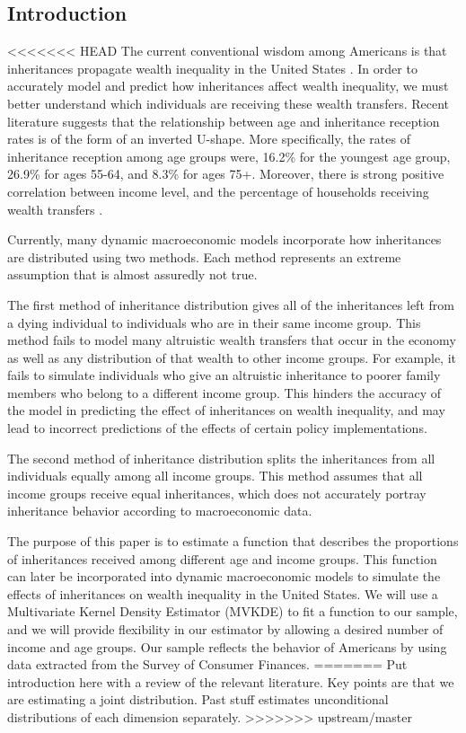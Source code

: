 \documentclass[letterpaper,12pt]{article}
\theoremstyle{definition}
\begin{document}
\begin{spacing}{1.5}

\section{Introduction}\label{SecIntro}

<<<<<<< HEAD
The current conventional wisdom among Americans is that inheritances propagate wealth inequality in the United States \citet{Wolff:2015}. In order to accurately model and predict how inheritances affect wealth inequality, we must better understand which individuals are receiving these wealth transfers. Recent literature suggests that the relationship between age and inheritance reception rates is of the form of an inverted U-shape. More specifically, the rates of inheritance reception among age groups were, 16.2\% for the youngest age group, 26.9\% for ages 55-64, and 8.3\% for ages 75+. Moreover, there is strong positive correlation between income level, and the percentage of households receiving wealth transfers \citet{Wolff:2015}.

Currently, many dynamic macroeconomic models incorporate how
inheritances are distributed using two methods. Each method represents an extreme assumption 
that is almost assuredly not true.

The first method of inheritance distribution gives all of the inheritances left from a dying 
individual to individuals who are in their same income group. This method fails to model many 
altruistic wealth transfers that occur in the economy as well as any distribution of that wealth to 
other income groups. For example, it fails to simulate individuals who give an altruistic inheritance 
to poorer family members who belong to a different income group. This hinders the accuracy of 
the model in predicting the effect of inheritances on wealth inequality, and may lead to incorrect 
predictions of the effects of certain policy implementations.

The second method of inheritance distribution splits the inheritances from all individuals 
equally among all income groups. This method assumes that all income groups receive equal 
inheritances, which does not accurately portray inheritance behavior according to macroeconomic data.

  The purpose of this paper is to estimate a function that describes the proportions of inheritances received among different age and income groups. This function can later be incorporated into dynamic macroeconomic models to simulate the effects of inheritances on wealth inequality in the United States. We will use a Multivariate Kernel Density Estimator (MVKDE) to fit a function to our sample, and we will provide flexibility in our estimator by allowing a desired number of income and age groups. Our sample reflects the behavior of Americans by using data extracted from the Survey of Consumer Finances.
=======
  Put introduction here with a review of the relevant literature. Key points are that we are estimating a joint distribution. Past stuff estimates unconditional distributions of each dimension separately.
>>>>>>> upstream/master



\end{spacing}
\end{document}
